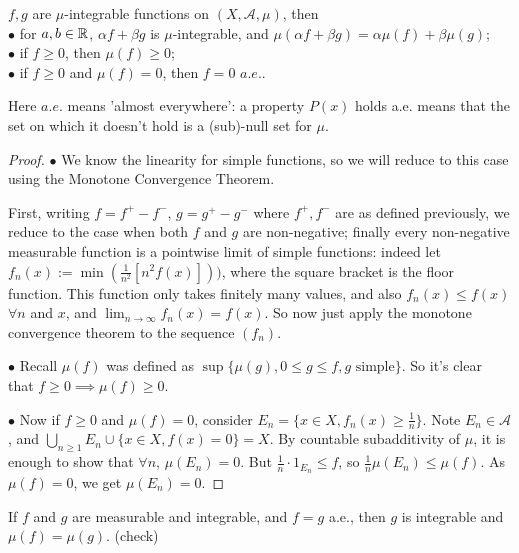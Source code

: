 \documentclass[a4paper]{article}
\begin{document}
\begin{coro}
$f,g$ are $\mu$-integrable functions on $(X,\mathcal{A},\mu)$, then\\
$\bullet$ for $a,b \in \mathbb{R}$, $\alpha f+\beta g$ is $\mu$-integrable, and $\mu(\alpha f+\beta g) = \alpha \mu(f) + \beta \mu(g)$;\\
$\bullet$ if $f \geq 0$, then $\mu(f) \geq 0$;\\
$\bullet$ if $f \geq 0$ and $\mu(f) = 0$, then $f=0$ $a.e.$.

Here $a.e.$ means 'almost everywhere': a property $P(x)$ holds a.e. means that the set on which it doesn't hold is a (sub)-null set for $\mu$.
\begin{proof}
$\bullet$ We know the linearity for simple functions, so we will reduce to this case using the Monotone Convergence Theorem.

First, writing $f=f^+-f^-$, $g=g^+-g^-$ where $f^+,f^-$ are as defined previously, we reduce to the case when both $f$ and $g$ are non-negative; finally every non-negative measurable function is a pointwise limit of simple functions: indeed let $f_n(x) := \min(\frac{1}{n^2}[n^2f(x)]))$, where the square bracket is the floor function. This function only takes finitely many values, and also $f_n(x) \leq f(x)$ $\forall n$ and $x$, and $\lim_{n \to \infty} f_n(x) = f(x)$. So now just apply the monotone convergence theorem to the sequence $(f_n)$.

$\bullet$ Recall $\mu(f)$ was defined as $\sup\{\mu(g),0 \leq g \leq f, g \text{ simple} \}$. So it's clear that $f \geq 0 \implies \mu(f) \geq 0$.

$\bullet$ Now if $f \geq 0$ and $\mu(f) = 0$, consider $E_n = \{x \in X,f_n(x) \geq \frac{1}{n}\}$. Note $E_n \in \mathcal{A}$, and $\bigcup_{n \geq 1} E_n \cup \{x \in X, f(x) = 0\} = X$. By countable subadditivity of $\mu$, it is enough to show that $\forall n$, $\mu(E_n) = 0$. But $\frac{1}{n} \cdot 1_{E_n} \leq f$, so $\frac{1}{n} \mu(E_n) \leq \mu(f)$. As $\mu(f) = 0$, we get $\mu(E_n) = 0$.
\end{proof}
\end{coro}

\begin{rem}
If $f$ and $g$ are measurable and integrable, and $f=g$ a.e., then $g$ is integrable and $\mu(f) = \mu(g)$. (check)
\end{rem}
\end{document}
